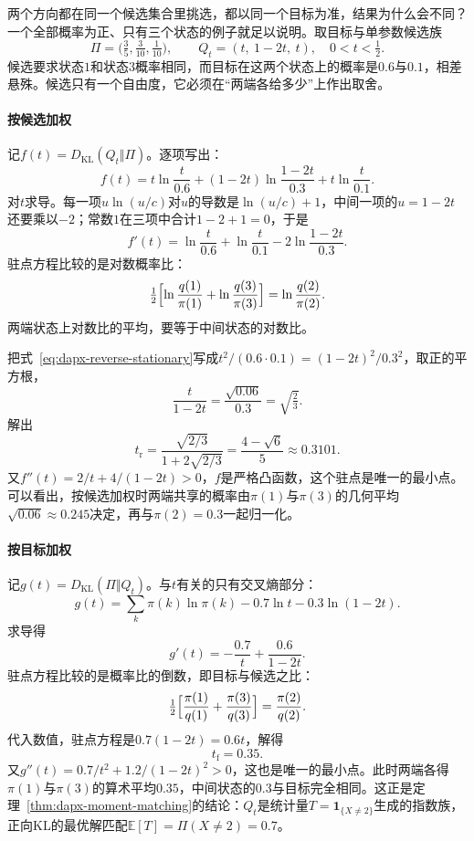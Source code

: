 两个方向都在同一个候选集合里挑选，都以同一个目标为准，结果为什么会不同？一个全部概率为正、只有三个状态的例子就足以说明。取目标与单参数候选族
\begin{equation}
 \Pi=\bigl(\tfrac35,\tfrac{3}{10},\tfrac{1}{10}\bigr),\qquad Q_t=(t,\ 1-2t,\ t),\quad 0<t<\tfrac12 .
 \label{eq:dapx-three-point}
\end{equation}
候选要求状态$1$和状态$3$概率相同，而目标在这两个状态上的概率是$0.6$与$0.1$，相差悬殊。候选只有一个自由度，它必须在“两端各给多少”上作出取舍。

\paragraph{按候选加权}
记$f(t)=D_{\mathrm{KL}}(Q_t\Vert\Pi)$。逐项写出：
\[
 f(t)=t\ln\frac{t}{0.6}+(1-2t)\ln\frac{1-2t}{0.3}+t\ln\frac{t}{0.1} .
\]
对$t$求导。每一项$u\ln(u/c)$对$u$的导数是$\ln(u/c)+1$，中间一项的$u=1-2t$还要乘以$-2$；常数$1$在三项中合计$1-2+1=0$，于是
\[
 f'(t)=\ln\frac{t}{0.6}+\ln\frac{t}{0.1}-2\ln\frac{1-2t}{0.3} .
\]
驻点方程比较的是对数概率比：
\begin{equation}
 \tfrac12\Bigl[\ln\frac{q(1)}{\pi(1)}+\ln\frac{q(3)}{\pi(3)}\Bigr]=\ln\frac{q(2)}{\pi(2)} .
 \label{eq:dapx-reverse-stationary}
\end{equation}
两端状态上对数比的平均，要等于中间状态的对数比。

把式~\eqref{eq:dapx-reverse-stationary}写成$t^{2}/(0.6\cdot0.1)=(1-2t)^{2}/0.3^{2}$，取正的平方根，
\[
 \frac{t}{1-2t}=\frac{\sqrt{0.06}}{0.3}=\sqrt{\tfrac23} .
\]
解出
\[
 t_{\mathrm{r}}=\frac{\sqrt{2/3}}{1+2\sqrt{2/3}}=\frac{4-\sqrt6}{5}\approx0.3101 .
\]
又$f''(t)=2/t+4/(1-2t)>0$，$f$是严格凸函数，这个驻点是唯一的最小点。可以看出，按候选加权时两端共享的概率由$\pi(1)$与$\pi(3)$的几何平均$\sqrt{0.06}\approx0.245$决定，再与$\pi(2)=0.3$一起归一化。

\paragraph{按目标加权}
记$g(t)=D_{\mathrm{KL}}(\Pi\Vert Q_t)$。与$t$有关的只有交叉熵部分：
\[
 g(t)=\sum_{k}\pi(k)\ln\pi(k)-0.7\ln t-0.3\ln(1-2t) .
\]
求导得
\[
 g'(t)=-\frac{0.7}{t}+\frac{0.6}{1-2t} .
\]
驻点方程比较的是概率比的倒数，即目标与候选之比：
\begin{equation}
 \tfrac12\Bigl[\frac{\pi(1)}{q(1)}+\frac{\pi(3)}{q(3)}\Bigr]=\frac{\pi(2)}{q(2)} .
 \label{eq:dapx-forward-stationary}
\end{equation}
代入数值，驻点方程是$0.7(1-2t)=0.6t$，解得
\[
 t_{\mathrm{f}}=0.35 .
\]
又$g''(t)=0.7/t^{2}+1.2/(1-2t)^{2}>0$，这也是唯一的最小点。此时两端各得$\pi(1)$与$\pi(3)$的算术平均$0.35$，中间状态的$0.3$与目标完全相同。这正是定理~\ref{thm:dapx-moment-matching}的结论：$Q_t$是统计量$T=\mathbf{1}_{\{X\neq2\}}$生成的指数族，正向KL的最优解匹配$\mathbb{E}[T]=\Pi(X\neq2)=0.7$。

